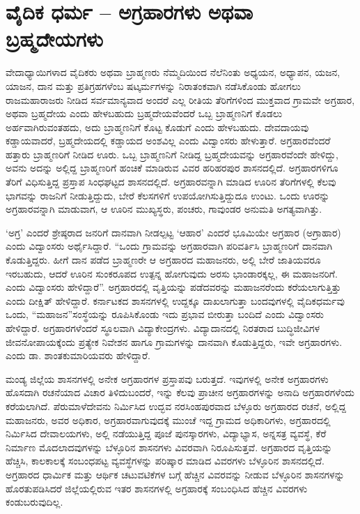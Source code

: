 \section{ವೈದಿಕ ಧರ್ಮ – ಅಗ್ರಹಾರಗಳು ಅಥವಾ ಬ್ರಹ್ಮದೇಯಗಳು}

ವೇದಾಧ್ಯಾಯಿಗಳಾದ ವೈದಿಕರು ಅಥವಾ ಬ್ರಾಹ್ಮಣರು ನೆಮ್ಮದಿಯಿಂದ ನೆಲೆನಿಂತು ಅಧ್ಯಯನ, ಅಧ್ಯಾಪನ, ಯಜನ, ಯಾಜನ, ದಾನ ಮತ್ತು ಪ್ರತಿಗ್ರಹಗಳೆಂಬ ಷಟ್ಕರ್ಮಗಳನ್ನು ನಿರಾತಂಕವಾಗಿ ನಡೆಸಿಕೊಂಡು ಹೋಗಲು ರಾಜಮಹಾರಾಜರು ನೀಡಿದ ಸರ್ವಮಾನ್ಯವಾದ ಅಂದರೆ ಎಲ್ಲ ರೀತಿಯ ತೆರಿಗೆಗಳಿಂದ ಮುಕ್ತವಾದ ಗ್ರಾಮವೇ ಅಗ್ರಹಾರ, ಅಥವಾ ಬ್ರಹ್ಮದೇಯ ಎಂದು ಹೇಳಬಹುದು ಬ್ರಹ್ಮದೇಯವೆಂದರೆ ಒಬ್ಬ ಬ್ರಾಹ್ಮಣನಿಗೆ ಕೊಡಲು ಅರ್ಹವಾಗಿರುವಂತಹದು, ಅದು ಬ್ರಾಹ್ಮಣನಿಗೆ ಕೊಟ್ಟ ಕೊಡುಗೆ ಎಂದು ಹೇಳಬಹುದು. ದೇವದಾಯವು ಕಡ್ಡಾಯವಾದರೆ, ಬ್ರಹ್ಮದೇಯದಲ್ಲಿ ಕಡ್ಡಾಯದ ಅಂಶವಿಲ್ಲ ಎಂದು ವಿದ್ವಾಂಸರು ಹೇಳುತ್ತಾರೆ. ಅಗ್ರಹಾರವೆಂದರೆ ಹತ್ತಾರು ಬ್ರಾಹ್ಮಣರಿಗೆ ನೀಡಿದ ಊರು. ಒಬ್ಬ ಬ್ರಾಹ್ಮಣನಿಗೆ ನೀಡಿದ್ದ ಬ್ರಹ್ಮದೇಯವನ್ನು ಅಗ್ರಹಾರವೆಂದೇ ಹೇಳಿದ್ದು, ಅವನು ಅದನ್ನು ಅಲ್ಲಿದ್ದ ಬ್ರಾಹ್ಮಣರಿಗೆ ಹಂಚಿಕೆ ಮಾಡಿರುವ ವಿವರ ಹರಿಹರಪುರ ಶಾಸನದಲ್ಲಿದೆ. ಅಗ್ರಹಾರಗಳಿಗೂ ತೆರಿಗೆ ವಿಧಿಸುತ್ತಿದ್ದ ಪ್ರಸ್ತಾಪ ಸಿಂಧಘಟ್ಟದ ಶಾಸನದಲ್ಲಿದೆ. ಅಗ್ರಹಾರವನ್ನಾಗಿ ಮಾಡಿದ ಊರಿನ ತೆರಿಗೆಗಳಲ್ಲಿ ಕೆಲವು ಭಾಗವನ್ನು ರಾಜನಿಗೆ ನೀಡುತ್ತಿದ್ದುದು, ಬೇರೆ ಕೆಲಸಗಳಿಗೆ ಉಪಯೋಗಿಸುತ್ತಿದ್ದುದೂ ಉಂಟು. ಒಂದು ಊರನ್ನು ಅಗ್ರಹಾರವನ್ನಾಗಿ ಮಾಡುವಾಗ, ಆ ಊರಿನ ಮುಖ್ಯಸ್ಥರು, ಪಂಚರು, ಗಾವುಂಡರ ಅನುಮತಿ ಅಗತ್ಯವಾಗಿತ್ತು.

‘ಅಗ್ರ’ ಎಂದರೆ ಶ್ರೇಷ್ಠರಾದ ಜನರಿಗೆ ದಾನವಾಗಿ ನೀಡಲ್ಪಟ್ಟ ‘ಆಹಾರ’ ಎಂದರೆ ಭೂಮಿಯೇ ಅಗ್ರಹಾರ (ಅಗ್ರಾಹಾರ) ಎಂದು ವಿದ್ವಾಂಸರು ಅರ್ಥೈಸಿದ್ದಾರೆ. “ಒಂದು ಗ್ರಾಮವನ್ನು ಅಗ್ರಹಾರವಾಗಿ ಪರಿವರ್ತಿಸಿ ಬ್ರಾಹ್ಮಣರಿಗೆ ದಾನವಾಗಿ ಕೊಡುತ್ತಿದ್ದರು. ಹೀಗೆ ದಾನ ಪಡೆದ ಬ್ರಾಹ್ಮಣರೇ ಆ ಅಗ್ರಹಾರದ ಮಹಾಜನರು, ಅಲ್ಲಿ ಬೇರೆ ಜಾತಿಯವರೂ ಇರಬಹುದು, ಆದರೆ ಊರಿನ ಸುಂಕರೂಪದ ಉತ್ಪನ್ನ ಹೋಗುವುದು ಅರಸು ಭಾಂಡಾರಕ್ಕಲ್ಲ, ಈ ಮಹಾಜನರಿಗೆ. ಎಂದು ವಿದ್ವಾಂಸರು ಹೇಳಿದ್ದಾರೆ”. ಅಗ್ರಹಾರದಲ್ಲಿ ವೃತ್ತಿಯನ್ನು ಪಡೆದವರನ್ನು ಮಹಾಜನರೆಂದು ಕರೆಯಲಾಗುತ್ತಿತ್ತು ಎಂದು ದೀಕ್ಷಿತ್​ ಹೇಳಿದ್ದಾರೆ. ಕರ್ನಾಟಕದ ಶಾಸನಗಳಲ್ಲಿ ಉದ್ದಕ್ಕೂ ದಾಖಲಾಗುತ್ತಾ ಬಂದವುಗಳಲ್ಲಿ ವೈದಿಕಧರ್ಮವು ಒಂದು, “ಮಹಾಜನ”ಸಂಸ್ಥೆಯನ್ನು ರೂಪಿಸಿಕೊಂಡು ಇದು ಪ್ರಭಾವ ಬೀರುತ್ತಾ ಬಂದಿದೆ ಎಂದು ವಿದ್ವಾಂಸರು ಹೇಳಿದ್ದಾರೆ. ಅಗ್ರಹಾರಗಳೆಂದರೆ ಸ್ಥೂಲವಾಗಿ ವಿದ್ಯಾಕೇಂದ್ರಗಳು. ವಿದ್ಯಾದಾನದಲ್ಲಿ ನಿರತರಾದ ಬುದ್ಧಿಜೀವಿಗಳ ಜೀವನೋಪಾಯಕ್ಕೆಂದು ಪ್ರತ್ಯೇಕ ನಿವೇಶನ ಹಾಗೂ ಗ್ರಾಮಗಳನ್ನು ದಾನವಾಗಿ ಕೊಡುತ್ತಿದ್ದರು, ಇವೇ ಅಗ್ರಹಾರಗಳು. ಎಂದು ಡಾ. ಶಾಂತಕುಮಾರಿಯವರು ಹೇಳಿದ್ದಾರೆ.

ಮಂಡ್ಯ ಜಿಲ್ಲೆಯ ಶಾಸನಗಳಲ್ಲಿ ಅನೇಕ ಅಗ್ರಹಾರಗಳ ಪ್ರಸ್ತಾಪವು ಬರುತ್ತದೆ. ಇವುಗಳಲ್ಲಿ ಅನೇಕ ಅಗ್ರಹಾರಗಳು ಹೊಸದಾಗಿ ರಚನೆಯಾದ ವಿಚಾರ ತಿಳಿದುಬಂದರೆ, ಇನ್ನು ಕೆಲವು ಪ್ರಾಚೀನ ಅಗ್ರಹಾರಗಳನ್ನು ಅನಾದಿ ಅಗ್ರಹಾರಗಳೆಂದು ಕರೆಯಲಾಗಿದೆ. ಪೆರುಮಾಳೆದೇವನು ನಿರ್ಮಿಸಿದ ಉದ್ಭವ ನರಸಿಂಹಪುರವಾದ ಬೆಳ್ಳೂರು ಅಗ್ರಹಾರದ ರಚನೆ, ಅಲ್ಲಿದ್ದ ಮಹಾಜನರು, ಅವರ ಅಧಿಕಾರ, ಅಗ್ರಹಾರವಾಗುವುದಕ್ಕೆ ಮುಂಚೆ ಇದ್ದ ಗ್ರಾಮದ ಅಧಿಕಾರಿಗಳು, ಅಗ್ರಹಾರದಲ್ಲಿ ನಿರ್ಮಿಸಿದ ದೇವಾಲಯಗಳು, ಅಲ್ಲಿ ನಡೆಯುತ್ತಿದ್ದ ಪೂಜೆ ಪುನಸ್ಕಾರಗಳು, ವಿದ್ಯಾಭ್ಯಾಸ, ಅನ್ನಸತ್ರ ವ್ಯವಸ್ಥೆ, ಕೆರೆ ನಿರ್ಮಾಣ ಮೊದಲಾದವುಗಳನ್ನು ಬೆಳ್ಳೂರಿನ ಶಾಸನಗಳು ವಿವರವಾಗಿ ನಿರೂಪಿಸುತ್ತವೆ. ಅಗ್ರಹಾರದ ವೃತ್ತಿಯನ್ನು ಹೆಚ್ಚಿಸಿ, ಕಾಲಕಾಲಕ್ಕೆ ಸಂಬಂಧಪಟ್ಟ ವ್ಯವಸ್ಥೆಗಳನ್ನು ಪರಿಷ್ಕಾರ ಮಾಡಿದ ವಿವರಗಳು ಬೆಳ್ಳೂರಿನ ಶಾಸನದಲ್ಲಿದೆ. ಅಗ್ರಹಾರದ ಧಾರ್ಮಿಕ ಮತ್ತು ಆರ್ಥಿಕ ಚಟುವಟಿಕೆಗಳ ಬಗ್ಗೆ ಹೆಚ್ಚಿನ ವಿವರವನ್ನು ನೀಡುವ ಬೆಳ್ಳೂರಿನ ಶಾಸನಗಳನ್ನು ಹೊರತುಪಡಿಸಿದರೆ ಜಿಲ್ಲೆಯಲ್ಲಿರುವ ಇತರ ಶಾಸನಗಳಲ್ಲಿ ಅಗ್ರಹಾರಕ್ಕೆ ಸಂಬಂಧಿಸಿದ ಹೆಚ್ಚಿನ ವಿವರಗಳು ಕಂಡುಬರುವುದಿಲ್ಲ.

